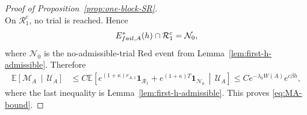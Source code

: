 \documentclass[10pt,a4paper]{amsart}
\begin{document}
\begin{proof}[Proof of Proposition~\ref{prop:one-block-SR}]
\[\]
On \(\mathcal R_1^c\), no trial is reached. Hence
\[
        E_{{\rm fail},A}^*(h)\cap\mathcal R_1^c
        =
        \mathcal N_0,
\]
where \(\mathcal N_0\) is the no-admissible-trial Red event from
Lemma~\ref{lem:first-h-admissible}. Therefore
\[
\begin{aligned}
        \mathbb E\left[
            \mathcal M_A
            \,\middle|\,
            \mathcal U_A
        \right]
        &\le
        C
        \mathbb E\left[
            e^{(1+\kappa)r_{A,1}}
            \mathbf 1_{\mathcal R_1}
            +
            e^{(1+\kappa) T}\mathbf 1_{\mathcal N_0}
            \,\middle|\,
            \mathcal U_A
        \right] \le
        C e^{-\lambda_0W(A)}e^{c\beta h},
\end{aligned}
\]
where the last inequality is Lemma~\ref{lem:first-h-admissible}. This proves
\eqref{eq:MA-bound}.








\end{proof}
\end{document}
